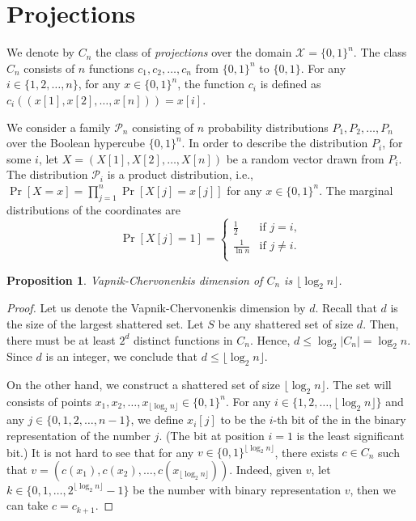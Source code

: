 \documentclass[10pt]{article}
\newtheorem{proposition}{Proposition}
\renewcommand{\P}{\mathcal{P}}
\newcommand{\X}{\mathcal{X}}
\begin{document}
\section{Projections}

We denote by $C_n$ the class of \emph{projections} over the domain $\X = \{0,1\}^n$. The
class $C_n$ consists of $n$ functions $c_1, c_2, \dots, c_n$ from $\{0,1\}^n$ to
$\{0,1\}$. For any $i \in \{1,2,\dots,n\}$, for any $x \in \{0,1\}^n$,
the function $c_i$ is defined as $c_i((x[1], x[2], \dots, x[n])) = x[i]$.

We consider a family $\P_n$ consisting of $n$ probability distributions $P_1,
P_2, \dots, P_n$ over the Boolean hypercube $\{0,1\}^n$. In order to describe
the distribution $P_i$, for some $i$, let $X = (X[1], X[2], \dots, X[n])$ be a
random vector drawn from $P_i$. The distribution $\P_i$ is a product
distribution, i.e., $\Pr[X = x] = \prod_{j=1}^n \Pr[X[j] = x[j]]$ for any $x \in
\{0,1\}^n$. The marginal distributions of the coordinates are
$$
\Pr[X[j] = 1] =
\begin{cases}
\frac{1}{2} & \text{if $j = i$,} \\
\frac{1}{\ln n} & \text{if $j\neq i$.} \\
\end{cases}
$$

\begin{proposition}
\label{proposition:vc-dimension-projections}
Vapnik-Chervonenkis dimension of $C_n$ is $\lfloor \log_2 n \rfloor$.
\end{proposition}

\begin{proof}
Let us denote the Vapnik-Chervonenkis dimension by $d$. Recall that $d$ is the
size of the largest shattered set. Let $S$ be any shattered set of size $d$.
Then, there must be at least $2^d$ distinct functions in $C_n$. Hence, $d \le
\log_2 |C_n| = \log_2 n$. Since $d$ is an integer, we conclude that $d \le
\lfloor \log_2 n \rfloor$.

On the other hand, we construct a shattered set of size $\lfloor \log_2 n
\rfloor$. The set will consists of points $x_1, x_2, \dots, x_{\lfloor \log_2 n
\rfloor} \in \{0,1\}^n$. For any $i \in \{1,2,\dots,\lfloor \log_2 n \rfloor\}$
and any $j \in \{0,1,2,\dots,n-1\}$, we define $x_i[j]$ to be the $i$-th bit of the
in the binary representation of the number $j$. (The bit at position $i=1$ is the
least significant bit.) It is not hard to see that for any $v \in
\{0,1\}^{\lfloor \log_2 n \rfloor}$, there exists $c \in C_n$ such that $v =
(c(x_1), c(x_2), \dots, c(x_{\lfloor \log_2 n \rfloor}))$. Indeed, given $v$,
let $k \in \{0,1,\dots,2^{\lfloor \log_2 n \rfloor} - 1\}$ be the number with
binary representation $v$, then we can take $c = c_{k+1}$.
\end{proof}
\end{document}
